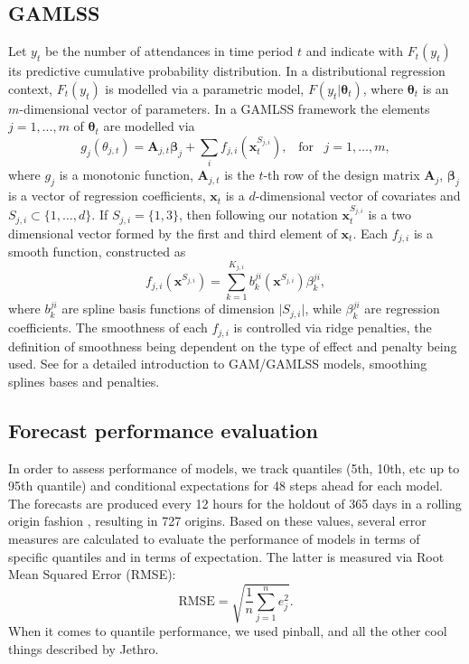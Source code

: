 \documentclass[]{elsarticle} %
\begin{document}
\hypertarget{gamlss}{%
\subsection{GAMLSS}\label{gamlss}}

Let \(y_t\) be the number of attendances in time period \(t\) and indicate with \(F_t(y_t)\) its predictive cumulative probability distribution. In a distributional regression context, \(F_t(y_t)\) is modelled via a parametric model, \(F(y_t|\bm \theta_t)\), where \(\bm \theta_t\) is an \(m\)-dimensional vector of parameters. In a GAMLSS framework \citet{Rigby2005} the elements \(j=1,...,m\) of \(\bm \theta_t\) are modelled via
\begin{equation} \label{eq:basicGAM}
    g_j(\theta_{j,t})=\mathbf{A}_{j,t} \bm{\beta}_j + \sum_{i} f_{j,i}({\bm x}^{S_{j,i}}_t), \;\;\; \text{for} \;\;\; j = 1, \dots, m,
\end{equation}
where \(g_j\) is a monotonic function, \(\mathbf{A}_{j,t}\) is the \(t\)-th row of the design matrix \(\mathbf{A}_j\), \(\bm \beta_j\) is a vector of regression coefficients, \(\bm x_t\) is a \(d\)-dimensional vector of covariates and \(S_{j,i} \subset \{1, \dots, d\}\). If \(S_{j,i} = \{1, 3\}\), then following our notation \({\bm x}_{t}^{S_{j,i}}\) is a two dimensional vector formed by the first and third element of \(\bm x_t\). Each \(f_{j,i}\) is a smooth function, constructed as
\begin{equation}
    f_{j,i}(\bm x^{S_{j,i}}) = \sum_{k=1}^{K_{j,i}} b^{ji}_k (\bm x^{S_{j,i}}) \beta_k^{ji},
\end{equation}
where \(b^{ji}_k\) are spline basis functions of dimension \(\vert S_{j,i} \vert\), while \(\beta_k^{ji}\) are regression coefficients. The smoothness of each \(f_{j,i}\) is controlled via ridge penalties, the definition of smoothness being dependent on the type of effect and penalty being used. See \citet{Wood2017} for a detailed introduction to GAM/GAMLSS models, smoothing splines bases and penalties.

\hypertarget{accuracy}{%
\subsection{Forecast performance evaluation}\label{accuracy}}

In order to assess performance of models, we track quantiles (5th, 10th, etc up to 95th quantile) and conditional expectations for 48 steps ahead for each model. The forecasts are produced every 12 hours for the holdout of 365 days in a rolling origin fashion \citep{Tashman2000}, resulting in 727 origins. Based on these values, several error measures are calculated to evaluate the performance of models in terms of specific quantiles and in terms of expectation. The latter is measured via Root Mean Squared Error (RMSE):
\begin{equation}
  \mathrm{RMSE} = \sqrt{\frac{1}{n} \sum_{j=1}^n e_j^2} .
  \label{eq:RMSE}
\end{equation}
When it comes to quantile performance, we used pinball, and all the other cool things described by Jethro.
\end{document}
